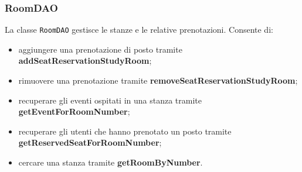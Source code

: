     \subsubsection{RoomDAO}
    La classe \texttt{RoomDAO} gestisce le stanze e le relative prenotazioni. Consente di:
    \begin{itemize}
        \item aggiungere una prenotazione di posto tramite \textbf{addSeatReservationStudyRoom};
        \item rimuovere una prenotazione tramite \textbf{removeSeatReservationStudyRoom};
        \item recuperare gli eventi ospitati in una stanza  tramite \textbf{getEventForRoomNumber};
        \item recuperare gli utenti che hanno prenotato un posto tramite \textbf{getReservedSeatForRoomNumber};
        \item cercare una stanza tramite \textbf{getRoomByNumber}.
    \end{itemize}

